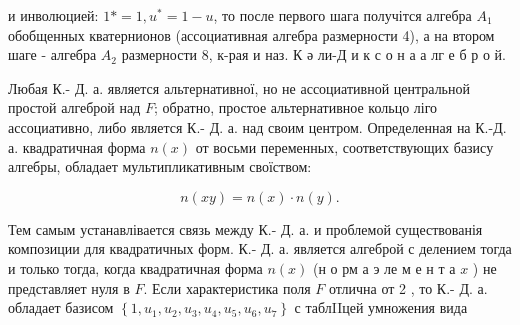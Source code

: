 \documentclass[10pt]{article}
\begin{document}
и инволюцией: $1 *=1, u^{*}=1-u$, то после первого шага получітся алгебра $A_{1}$ обобщенных кватернионов (ассоциативная алгебра размерности 4), а на втором шаге - алгебра $A_{2}$ размерности 8, к-рая и наз. К ә ли-Д и к с о н а а лг е б р о й.



Любая К.- Д. а. является альтернативної, но не ассоциативной центральной простой алгеброй над $F$; обратно, простое альтернативное кольцо ліго ассоциативно, либо является К.- Д. а. над своим центром. Определенная на К.-Д. а. квадратичная форма $n(x)$ от восьми переменных, соответствующих базису алгебры, обладает мультипликативным своїством:



\[

n(x y)=n(x) \cdot n(y) .

\]



Тем самым устанавлівается связь между К.- Д. а. и проблемой существованія композиции для квадратичных форм. К.- Д. а. является алгеброй с делением тогда и только тогда, когда квадратичная форма $n(x)$ (н о рм а э ле м е н т а $x$ ) не представляет нуля в $F$. Если характеристика поля $F$ отлична от 2 , то К.- Д. а. обладает базисом $\left\{1, u_{1}, u_{2}, u_{3}, u_{4}, u_{5}, u_{6}, u_{7}\right\}$ с таблIIцей умножения вида
\end{document}
